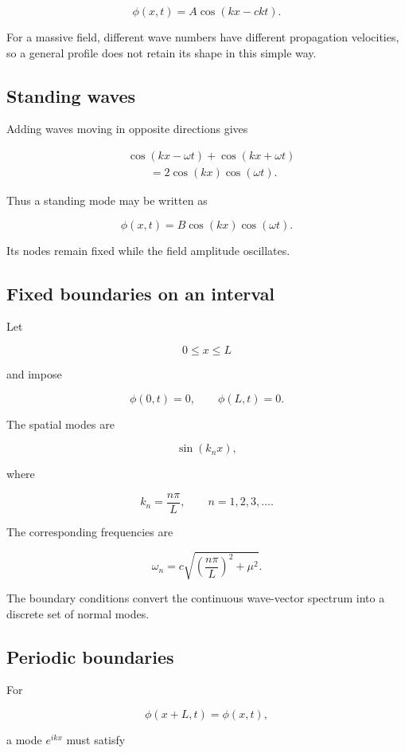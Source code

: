 \[
\phi(x,t)=A\cos(kx-ckt).
\]

For a massive field, different wave numbers have different propagation velocities, so a general profile does not retain its shape in this simple way.

\subsection{Standing waves}

Adding waves moving in opposite directions gives

\[
\begin{aligned}
&\cos(kx-\omega t)
+
\cos(kx+\omega t)\\
&\qquad=
2\cos(kx)\cos(\omega t).
\end{aligned}
\]

Thus a standing mode may be written as

\[
\boxed{
\phi(x,t)
=
B\cos(kx)\cos(\omega t)
}.
\]

Its nodes remain fixed while the field amplitude oscillates.

\subsection{Fixed boundaries on an interval}

Let

\[
0\leq x\leq L
\]

and impose

\[
\phi(0,t)=0,
\qquad
\phi(L,t)=0.
\]

The spatial modes are

\[
\sin(k_{n}x),
\]

where

\[
\boxed{
k_{n}=\frac{n\pi}{L},
\qquad
n=1,2,3,\ldots
}.
\]

The corresponding frequencies are

\[
\boxed{
\omega_{n}
=
c
\sqrt{
\left(
\frac{n\pi}{L}
\right)^{2}
+
\mu^{2}
}
}.
\]

The boundary conditions convert the continuous wave-vector spectrum into a discrete set of normal modes.

\subsection{Periodic boundaries}

For

\[
\phi(x+L,t)=\phi(x,t),
\]

a mode \(e^{ikx}\) must satisfy

